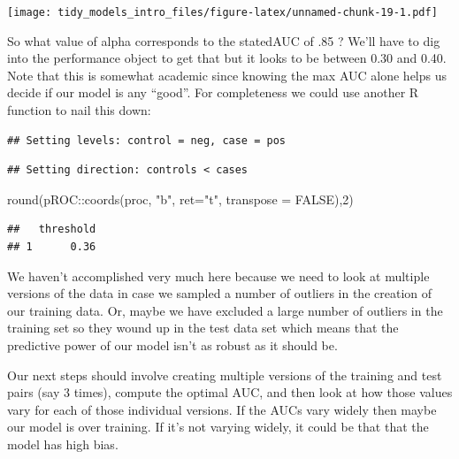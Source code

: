 \documentclass[
]{article}
\newenvironment{Shaded}{\begin{snugshade}}{\end{snugshade}}
\newcommand{\AttributeTok}[1]{\textcolor[rgb]{0.77,0.63,0.00}{#1}}
\newcommand{\ConstantTok}[1]{\textcolor[rgb]{0.00,0.00,0.00}{#1}}
\newcommand{\DecValTok}[1]{\textcolor[rgb]{0.00,0.00,0.81}{#1}}
\newcommand{\FunctionTok}[1]{\textcolor[rgb]{0.00,0.00,0.00}{#1}}
\newcommand{\NormalTok}[1]{#1}
\newcommand{\OtherTok}[1]{\textcolor[rgb]{0.56,0.35,0.01}{#1}}
\newcommand{\SpecialCharTok}[1]{\textcolor[rgb]{0.00,0.00,0.00}{#1}}
\newcommand{\StringTok}[1]{\textcolor[rgb]{0.31,0.60,0.02}{#1}}
\begin{document}
\texttt{[image: tidy\_models\_intro\_files/figure-latex/unnamed-chunk-19-1.pdf]}

So what value of alpha corresponds to the statedAUC of .85 ? We'll have
to dig into the performance object to get that but it looks to be
between 0.30 and 0.40. Note that this is somewhat academic since knowing
the max AUC alone helps us decide if our model is any ``good''. For
completeness we could use another R function to nail this down:

\begin{Shaded}
\end{Shaded}

\begin{verbatim}
## Setting levels: control = neg, case = pos
\end{verbatim}

\begin{verbatim}
## Setting direction: controls < cases
\end{verbatim}

\begin{Shaded}
\begin{Highlighting}[]
\FunctionTok{round}\NormalTok{(pROC}\SpecialCharTok{::}\FunctionTok{coords}\NormalTok{(proc, }\StringTok{"b"}\NormalTok{, }\AttributeTok{ret=}\StringTok{"t"}\NormalTok{, }\AttributeTok{transpose =} \ConstantTok{FALSE}\NormalTok{),}\DecValTok{2}\NormalTok{)}
\end{Highlighting}
\end{Shaded}

\begin{verbatim}
##   threshold
## 1      0.36
\end{verbatim}

We haven't accomplished very much here because we need to look at
multiple versions of the data in case we sampled a number of outliers in
the creation of our training data. Or, maybe we have excluded a large
number of outliers in the training set so they wound up in the test data
set which means that the predictive power of our model isn't as robust
as it should be.

Our next steps should involve creating multiple versions of the training
and test pairs (say 3 times), compute the optimal AUC, and then look at
how those values vary for each of those individual versions. If the AUCs
vary widely then maybe our model is over training. If it's not varying
widely, it could be that that the model has high bias.
\end{document}
